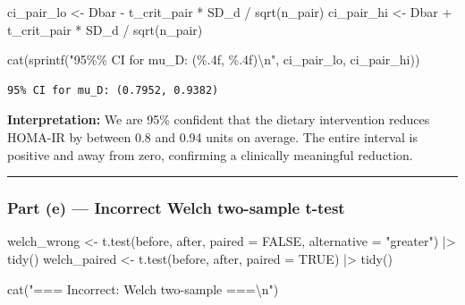 \documentclass[
  letterpaper,
  DIV=11,
  numbers=noendperiod]{scrartcl}
\newenvironment{Shaded}{\begin{snugshade}}{\end{snugshade}}
\newcommand{\AttributeTok}[1]{\textcolor[rgb]{0.40,0.45,0.13}{#1}}
\newcommand{\ConstantTok}[1]{\textcolor[rgb]{0.56,0.35,0.01}{#1}}
\newcommand{\FunctionTok}[1]{\textcolor[rgb]{0.28,0.35,0.67}{#1}}
\newcommand{\NormalTok}[1]{\textcolor[rgb]{0.00,0.23,0.31}{#1}}
\newcommand{\OtherTok}[1]{\textcolor[rgb]{0.00,0.23,0.31}{#1}}
\newcommand{\SpecialCharTok}[1]{\textcolor[rgb]{0.37,0.37,0.37}{#1}}
\newcommand{\StringTok}[1]{\textcolor[rgb]{0.13,0.47,0.30}{#1}}
\begin{document}
\begin{Shaded}
\begin{Highlighting}[]
\NormalTok{ci\_pair\_lo }\OtherTok{\textless{}{-}}\NormalTok{ Dbar }\SpecialCharTok{{-}}\NormalTok{ t\_crit\_pair }\SpecialCharTok{*}\NormalTok{ SD\_d }\SpecialCharTok{/} \FunctionTok{sqrt}\NormalTok{(n\_pair)}
\NormalTok{ci\_pair\_hi }\OtherTok{\textless{}{-}}\NormalTok{ Dbar }\SpecialCharTok{+}\NormalTok{ t\_crit\_pair }\SpecialCharTok{*}\NormalTok{ SD\_d }\SpecialCharTok{/} \FunctionTok{sqrt}\NormalTok{(n\_pair)}

\FunctionTok{cat}\NormalTok{(}\FunctionTok{sprintf}\NormalTok{(}\StringTok{"95\%\% CI for mu\_D: (\%.4f, \%.4f)}\SpecialCharTok{\textbackslash{}n}\StringTok{"}\NormalTok{, ci\_pair\_lo, ci\_pair\_hi))}
\end{Highlighting}
\end{Shaded}

\begin{verbatim}
95% CI for mu_D: (0.7952, 0.9382)
\end{verbatim}

\textbf{Interpretation:} We are 95\% confident that the dietary
intervention reduces HOMA-IR by between 0.8 and 0.94 units on average.
The entire interval is positive and away from zero, confirming a
clinically meaningful reduction.

\begin{center}\rule{0.5\linewidth}{0.5pt}\end{center}

\subsubsection{Part (e) --- Incorrect Welch two-sample
t-test}\label{part-e-incorrect-welch-two-sample-t-test}

\begin{Shaded}
\begin{Highlighting}[]
\NormalTok{welch\_wrong }\OtherTok{\textless{}{-}} \FunctionTok{t.test}\NormalTok{(before, after, }\AttributeTok{paired =} \ConstantTok{FALSE}\NormalTok{, }
                       \AttributeTok{alternative =} \StringTok{"greater"}\NormalTok{) }\SpecialCharTok{|\textgreater{}} \FunctionTok{tidy}\NormalTok{()}
\NormalTok{welch\_paired }\OtherTok{\textless{}{-}} \FunctionTok{t.test}\NormalTok{(before, after, }\AttributeTok{paired =} \ConstantTok{TRUE}\NormalTok{) }\SpecialCharTok{|\textgreater{}} \FunctionTok{tidy}\NormalTok{()}

\FunctionTok{cat}\NormalTok{(}\StringTok{"=== Incorrect: Welch two{-}sample ===}\SpecialCharTok{\textbackslash{}n}\StringTok{"}\NormalTok{)}
\end{Highlighting}
\end{Shaded}
\end{document}

